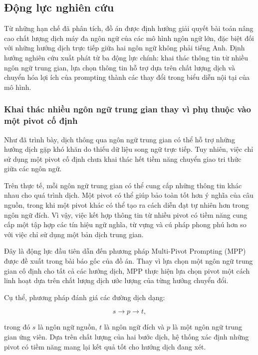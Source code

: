 \subsection{Động lực nghiên cứu}
\label{sec:research_motivation}

Từ những hạn chế đã phân tích, đồ án được định hướng giải quyết bài toán nâng cao chất lượng dịch máy đa ngôn ngữ của các mô hình ngôn ngữ lớn, đặc biệt đối với những hướng dịch trực tiếp giữa hai ngôn ngữ không phải tiếng Anh. Định hướng nghiên cứu xuất phát từ ba động lực chính: khai thác thông tin từ nhiều ngôn ngữ trung gian, lựa chọn thông tin hỗ trợ dựa trên chất lượng dịch và chuyển hóa lợi ích của prompting thành các thay đổi trong biểu diễn nội tại của mô hình.

\subsubsection{Khai thác nhiều ngôn ngữ trung gian thay vì phụ thuộc vào một pivot cố định}

Như đã trình bày, dịch thông qua ngôn ngữ trung gian có thể hỗ trợ những hướng dịch gặp khó khăn do thiếu dữ liệu song ngữ trực tiếp. Tuy nhiên, việc chỉ sử dụng một pivot cố định chưa khai thác hết tiềm năng chuyển giao tri thức giữa các ngôn ngữ.

Trên thực tế, mỗi ngôn ngữ trung gian có thể cung cấp những thông tin khác nhau cho quá trình dịch. Một pivot có thể giúp bảo toàn tốt hơn ý nghĩa của câu nguồn, trong khi một pivot khác có thể tạo ra cách diễn đạt tự nhiên hơn trong ngôn ngữ đích. Vì vậy, việc kết hợp thông tin từ nhiều pivot có tiềm năng cung cấp một tập hợp các tín hiệu ngữ nghĩa, từ vựng và cú pháp phong phú hơn so với việc chỉ sử dụng một bản dịch trung gian.

Đây là động lực đầu tiên dẫn đến phương pháp Multi-Pivot Prompting (MPP) được đề xuất trong bài báo gốc của đồ án. Thay vì lựa chọn một ngôn ngữ trung gian cố định cho tất cả các hướng dịch, MPP thực hiện lựa chọn pivot một cách linh hoạt dựa trên chất lượng dịch ước lượng của từng hướng chuyển đổi.

Cụ thể, phương pháp đánh giá các đường dịch dạng:

\begin{equation}
    s \rightarrow p \rightarrow t,
\end{equation}

trong đó $s$ là ngôn ngữ nguồn, $t$ là ngôn ngữ đích và $p$ là một ngôn ngữ trung gian ứng viên. Dựa trên chất lượng của hai bước dịch, hệ thống xác định những pivot có tiềm năng mang lại kết quả tốt cho hướng dịch đang xét.

